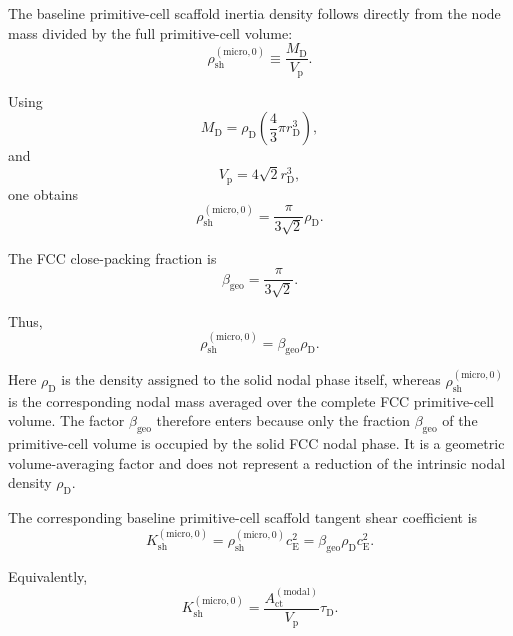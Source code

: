 The baseline primitive-cell scaffold inertia density follows directly from the node mass divided by the full primitive-cell volume:
\begin{equation}
    \rho_{\mathrm{sh}}^{(\mathrm{micro},0)} \equiv \frac{M_{\mathrm{D}}}{V_{\mathrm{p}}}.
\end{equation}

Using
\begin{equation}
    M_{\mathrm{D}} = \rho_{\mathrm{D}} \left( \frac{4}{3}\pi r_{\mathrm{D}}^3 \right),
\end{equation}
and
\begin{equation}
    V_{\mathrm{p}} = 4\sqrt{2}r_{\mathrm{D}}^3,
\end{equation}
one obtains
\begin{equation}
    \rho_{\mathrm{sh}}^{(\mathrm{micro},0)} = \frac{\pi}{3\sqrt{2}}\rho_{\mathrm{D}}.
\end{equation}

The FCC close-packing fraction is
\begin{equation}
    \beta_{\mathrm{geo}} = \frac{\pi}{3\sqrt{2}}.
\end{equation}

Thus,
\begin{equation}
    \rho_{\mathrm{sh}}^{(\mathrm{micro},0)} = \beta_{\mathrm{geo}}\rho_{\mathrm{D}}.
\end{equation}

Here $\rho_{\mathrm{D}}$ is the density assigned to the solid nodal phase itself, whereas $\rho_{\mathrm{sh}}^{(\mathrm{micro},0)}$ is the corresponding nodal mass averaged over the complete FCC primitive-cell volume. The factor $\beta_{\mathrm{geo}}$ therefore enters because only the fraction $\beta_{\mathrm{geo}}$ of the primitive-cell volume is occupied by the solid FCC nodal phase. It is a geometric volume-averaging factor and does not represent a reduction of the intrinsic nodal density $\rho_{\mathrm{D}}$.

The corresponding baseline primitive-cell scaffold tangent shear coefficient is
\begin{equation}
    K_{\mathrm{sh}}^{(\mathrm{micro},0)} = \rho_{\mathrm{sh}}^{(\mathrm{micro},0)}c_{\mathrm{E}}^2 = \beta_{\mathrm{geo}}\rho_{\mathrm{D}}c_{\mathrm{E}}^2.
\end{equation}

Equivalently,
\begin{equation}
    K_{\mathrm{sh}}^{(\mathrm{micro},0)} = \frac{A_{\mathrm{ct}}^{(\mathrm{modal})}}{V_{\mathrm{p}}}\tau_{\mathrm{D}}.
\end{equation}

